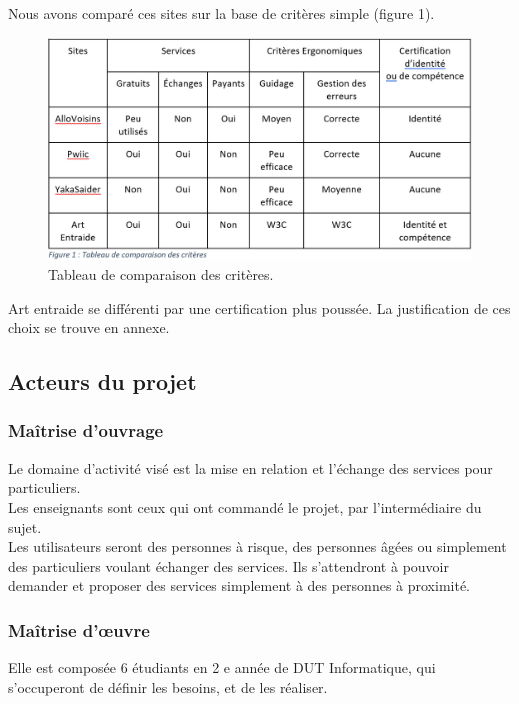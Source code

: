 \documentclass[a4paper,11pt]{article}
\begin{document}
Nous avons comparé ces sites sur la base de critères simple (figure 1).

\begin{figure}[H]
  \includegraphics[width=\linewidth]{images/tableau-ergo.png}
  \caption{Tableau de comparaison des critères.}
  \label{fig:table1}
\end{figure}

Art entraide se différenti par une certification plus poussée.
La justification de ces choix se trouve en annexe.\\

\subsection{Acteurs du projet}
\subsubsection{Maîtrise d’ouvrage}

Le domaine d’activité visé est la mise en relation et l’échange des services pour particuliers.\\

Les enseignants sont ceux qui ont commandé le projet, par l’intermédiaire du sujet.\\

Les utilisateurs seront des personnes à risque, des personnes âgées ou simplement des particuliers
voulant échanger des services. Ils s’attendront à pouvoir demander et proposer des services
simplement à des personnes à proximité.\\

\subsubsection{Maîtrise d'œuvre}

Elle est composée 6 étudiants en 2 e année de DUT Informatique, qui s’occuperont de définir les
besoins, et de les réaliser.\\
\end{document}
